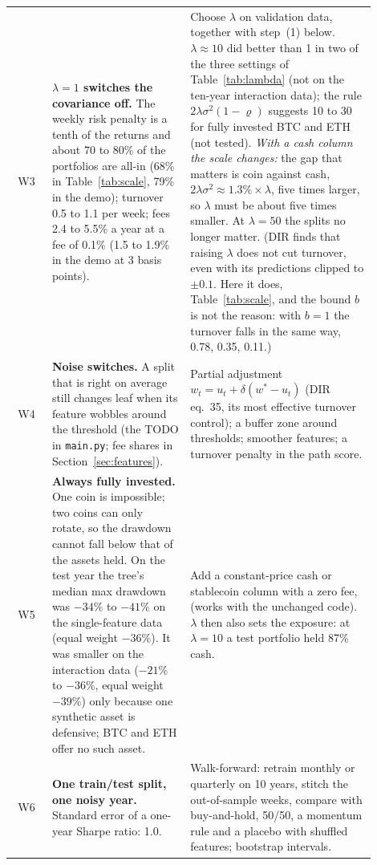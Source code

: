 \documentclass[11pt,a4paper]{article}
\newcommand{\1}{\mathbf{1}}
\newcommand{\code}[1]{\texttt{\detokenize{#1}}}
\begin{document}
\begin{longtable}{@{}c >{\raggedright\arraybackslash}p{0.385\linewidth} >{\raggedright\arraybackslash}p{0.515\linewidth}@{}}
\addlinespace
W3 & \textbf{$\lambda=1$ switches the covariance off.} The weekly risk penalty is a tenth of the returns and about 70 to 80\% of the portfolios are all-in (68\% in Table~\ref{tab:scale}, 79\% in the demo); turnover 0.5 to 1.1 per week; fees 2.4 to 5.5\% a year at a fee of 0.1\% (1.5 to 1.9\% in the demo at 3 basis points). & Choose $\lambda$ on validation data, together with step~(1) below. $\lambda\approx10$ did better than 1 in two of the three settings of Table~\ref{tab:lambda} (not on the ten-year interaction data); the rule $2\lambda\sigma^2(1-\varrho)$ suggests 10 to 30 for fully invested BTC and ETH (not tested). \emph{With a cash column the scale changes:} the gap that matters is coin against cash, $2\lambda\sigma^2\approx1.3\%\times\lambda$, five times larger, so $\lambda$ must be about five times smaller. At $\lambda=50$ the splits no longer matter. (DIR finds that raising $\lambda$ does not cut turnover, even with its predictions clipped to $\pm0.1$. Here it does, Table~\ref{tab:scale}, and the bound $b$ is not the reason: with $b=1$ the turnover falls in the same way, 0.78, 0.35, 0.11.)\\
\addlinespace
W4 & \textbf{Noise switches.} A split that is right on average still changes leaf when its feature wobbles around the threshold (the TODO in \texttt{main.py}; fee shares in Section~\ref{sec:features}). & Partial adjustment $w_t=u_t+\delta(w^\ast-u_t)$ (DIR eq.~35, its most effective turnover control); a buffer zone around thresholds; smoother features; a turnover penalty in the path score.\\
\addlinespace
W5 & \textbf{Always fully invested.} One coin is impossible; two coins can only rotate, so the drawdown cannot fall below that of the assets held. On the test year the tree's median max drawdown was $-34\%$ to $-41\%$ on the single-feature data (equal weight $-36\%$). It was smaller on the interaction data ($-21\%$ to $-36\%$, equal weight $-39\%$) only because one synthetic asset is defensive; BTC and ETH offer no such asset. & Add a constant-price cash or stablecoin column with a zero fee, \code{fee_rate=(f, f, 0)} (works with the unchanged code). $\lambda$ then also sets the exposure: at $\lambda=10$ a test portfolio held 87\% cash.\\
\addlinespace
W6 & \textbf{One train/test split, one noisy year.} Standard error of a one-year Sharpe ratio: 1.0. & Walk-forward: retrain monthly or quarterly on 10 years, stitch the out-of-sample weeks, compare with buy-and-hold, 50/50, a momentum rule and a placebo with shuffled features; bootstrap intervals.\\

\end{longtable}
\end{document}
